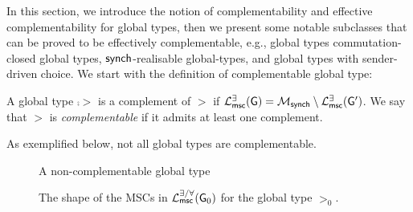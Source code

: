 

In this section, we introduce the notion of complementability and effective complementability for global types, 
then we present some notable subclasses that can be proved to be effectively complementable, e.g., global types 
commutation-closed global types, $\mathsf{synch}$-realisable global-types, and global types
with sender-driven choice. 
We start with the definition of complementable global type:

\begin{definition}
    A global type $\comp{\gt}$ is a complement of $\gt$ 
    if $\mathcal{L}_{\mathsf{msc}}^{\exists}(\mathsf{G})=
     \mathcal{M}_{\mathsf{synch}}
    \setminus
    \mathcal{L}_{\mathsf{msc}}^{\exists}(\mathsf{G}')$.
    We say that $\gt$ is {\em complementable} if it admits at least one complement.
\end{definition}

As exemplified below, not all global types are complementable. 
\begin{figure}[ht]
    
    \caption{A non-complementable global type
    \label{fig:non-complementable-gt-1}}
\end{figure} 

\begin{figure}
    
    \caption{The shape of the MSCs in $\mathcal{L}_{\mathsf{msc}}^{\exists/\forall}(\mathsf{G}_0){}$ for the global type $\gt_0$.
    \label{fig:msc-regular}}
\end{figure} 

